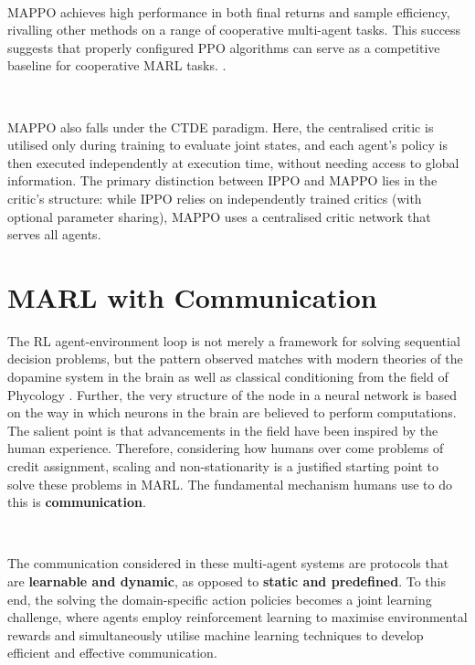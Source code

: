 \documentclass{article}
\begin{document}
\

MAPPO achieves high performance in both final returns and sample efficiency, rivalling other methods on a range of cooperative multi-agent tasks. This success suggests that properly configured PPO algorithms can serve as a competitive baseline for cooperative MARL tasks. \citep{chao2021surprising}.

\

MAPPO also falls under the CTDE paradigm. Here, the centralised critic is utilised only during training to evaluate joint states, and each agent’s policy is then executed independently at execution time, without needing access to global information. The primary distinction between IPPO and MAPPO lies in the critic’s structure: while IPPO relies on independently trained critics (with optional parameter sharing), MAPPO uses a centralised critic network that serves all agents.

\newpage

\section{MARL with Communication}

The RL agent-environment loop is not merely a framework for solving sequential decision problems, but the pattern observed matches with modern theories of the dopamine system in the brain \citep{paul2011understanding} as well as classical conditioning from the field of Phycology \citep{gowda2024bridging}. Further, the very structure of the node in a neural network is based on the way in which neurons in the brain are believed to perform computations. The salient point is that advancements in the field have been inspired by the human experience. Therefore, considering how humans over come problems of credit assignment, scaling and non-stationarity is a justified starting point to solve these problems in MARL. The fundamental mechanism humans use to do this is \textbf{communication}.

\ 

The communication considered in these multi-agent systems are protocols that are \textbf{learnable and dynamic}, as opposed to \textbf{static and predefined}. To this end, the solving the domain-specific action policies becomes a joint learning challenge, where agents employ reinforcement learning to maximise environmental rewards and simultaneously utilise machine learning techniques to develop efficient and effective communication. \citep{zhu2024survey}
\end{document}
